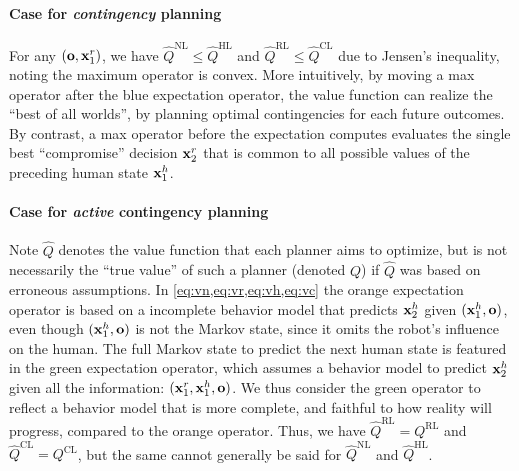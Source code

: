 \paragraph{Case for \textit{contingency} planning}
For any $({\mathbf{o}},\mathbf{x}^r_1)$, we have $\hat{Q}^{\text{NL}} \leq \hat{Q}^{\text{HL}}$ and $\hat{Q}^{\text{RL}} \leq \hat{Q}^{\text{CL}}$ due to Jensen's inequality, noting the maximum operator is convex. 
More intuitively, by moving a max operator after the blue expectation operator, the value function can realize the ``best of all worlds'', by planning optimal contingencies for each future outcomes. By contrast, a max operator before the expectation computes evaluates the single best ``compromise'' decision $\mathbf{x}^r_2$ that is common to all possible values of the preceding human state $\mathbf{x}^h_1$.

\paragraph{Case for \textit{active} contingency planning}
Note $\hat{Q}$ denotes the value function that each planner aims to optimize, but is not necessarily the ``true value'' of such a planner (denoted $Q$) if $\hat{Q}$ was based on erroneous assumptions.
In \cref{eq:vn,eq:vr,eq:vh,eq:vc} the orange expectation operator is based on a incomplete behavior model that predicts $\mathbf{x}^h_2$ given $(\mathbf{x}^h_1,{\mathbf{o}})$, even though $(\mathbf{x}^h_1,{\mathbf{o}})$ is not the Markov state, since it omits the robot's influence on the human. The full Markov state to predict the next human state is featured in the green expectation operator, which assumes a behavior model to predict $\mathbf{x}^h_2$ given all the information: $(\mathbf{x}^r_1,\mathbf{x}^h_1,{\mathbf{o}})$. We thus consider the green operator to reflect a behavior model that is more complete, and faithful to how reality will progress, compared to the orange operator. Thus, we have $\hat{Q}^{\text{RL}}=Q^{\text{RL}}$ and $\hat{Q}^{\text{CL}}=Q^{\text{CL}}$, but the same cannot generally be said for $\hat{Q}^{\text{NL}}$ and $\hat{Q}^{\text{HL}}$.

